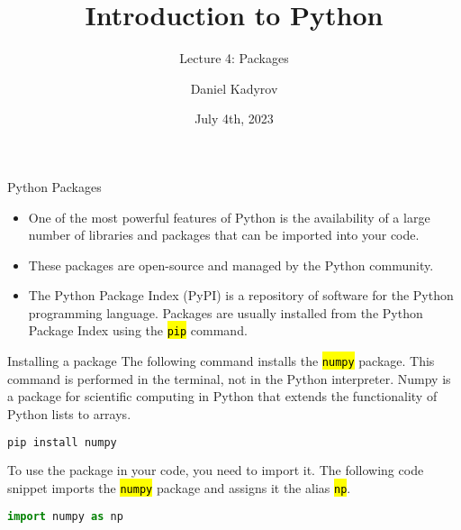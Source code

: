\documentclass[
    aspectratio=169, 
    usepdftitle=false, 
    xcolor={dvipsnames},
    hyperref={
        colorlinks,
        linkcolor=black,
        urlcolor=blue}
    ]{beamer}
\title[Introduction to Python]{Introduction to Python}
\subtitle{Lecture 4: Packages}
\author{Daniel Kadyrov}
\date{July 4th, 2023}
\let\OldTexttt\texttt
\renewcommand{\texttt}[1]{\OldTexttt{\hl{#1}}}%
\begin{document}
\begin{frame}
    \titlepage
\end{frame}

\begin{frame}{Python Packages}
    \begin{itemize}
    \item One of the most powerful features of Python is the availability of a large number of libraries and packages that can be imported into your code.
    \item These packages are open-source and managed by the Python community.
    \item The Python Package Index (PyPI) is a repository of software for the Python programming language. Packages are usually installed from the Python Package Index using the \texttt{pip} command.
    \end{itemize}
\end{frame}

\begin{frame}[fragile]{Installing a package}
    The following command installs the \texttt{numpy} package. This command is performed in the terminal, not in the Python interpreter. Numpy is a package for scientific computing in Python that extends the functionality of Python lists to arrays.

    \begin{lstlisting}[language=bash]
pip install numpy
    \end{lstlisting}

    To use the package in your code, you need to import it. The following code snippet imports the \texttt{numpy} package and assigns it the alias \texttt{np}.

    \begin{lstlisting}[language=Python]
import numpy as np
    \end{lstlisting}
\end{frame}
\end{document}
